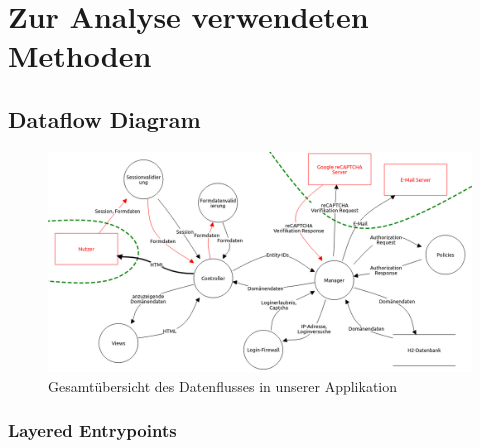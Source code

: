 \documentclass[12pt,DIV14,BCOR10mm,a4paper,twoside,parskip=half-,headsepline,headinclude,english,ngerman,bibliography=totocnumbered]{scrreprt}
\begin{document}
\tableofcontents  %

\printbibliography

\chapter{Zur Analyse verwendeten Methoden}
\section{Dataflow Diagram}

\begin{figure}[htbp]
  \hspace*{-1.75cm}
  \label{overview-dfd-pic}
  \includegraphics[width=1.25\linewidth]{resources/overview-dfd.jpg}
  \caption{Gesamtübersicht des Datenflusses in unserer Applikation}
\end{figure}

\subsection{Layered Entrypoints}

\renewcommand{\labelenumi}{\theenumi}
\renewcommand{\theenumi}{\arabic{enumi}}
\renewcommand{\labelenumii}{\theenumii}
\renewcommand{\theenumii}{\theenumi.\arabic{enumii}}
\renewcommand{\labelenumiii}{\theenumiii}
\renewcommand{\theenumiii}{\theenumii.\arabic{enumiii}}
\renewcommand{\labelenumiv}{\theenumiv}
\renewcommand{\theenumiv}{\theenumiii.\arabic{enumiv}}
\end{document}

